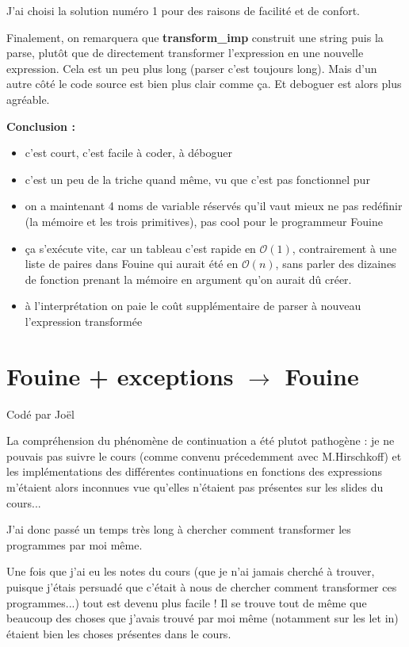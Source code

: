 \documentclass[a4paper,10pt]{report}
\begin{document}
J'ai choisi la solution numéro 1 pour des raisons de facilité et de confort. 
  
Finalement, on remarquera que \textbf{transform\_{}imp} construit une string puis la parse, plutôt que de directement transformer l'expression en une nouvelle expression. Cela est un peu plus long (parser c'est toujours long). Mais d'un autre côté le code source est bien plus clair comme ça. Et deboguer est alors plus agréable.

\textbf{Conclusion :}  
  
\begin{itemize}
\item c'est court, c'est facile à coder, à déboguer
\item c'est un peu de la triche quand même, vu que c'est pas fonctionnel pur
\item on a maintenant 4 noms de variable réservés qu'il vaut mieux ne pas redéfinir (la mémoire et les trois primitives), pas cool pour le programmeur Fouine
\item ça s'exécute vite, car un tableau c'est rapide en $\mathcal{O}(1)$, contrairement à une liste de paires dans Fouine qui aurait été en $\mathcal{O}(n)$, sans parler des dizaines de fonction prenant la mémoire en argument qu'on aurait dû créer.
\item à l'interprétation on paie le coût supplémentaire de parser à nouveau l'expression transformée
\end{itemize}

\section{Fouine + exceptions $\rightarrow$ Fouine}
Codé par Joël

La compréhension du phénomène de continuation a été plutot pathogène : je ne pouvais pas suivre le cours (comme convenu précedemment avec M.Hirschkoff) et les implémentations des différentes continuations en fonctions des expressions m'étaient alors inconnues vue qu'elles n'étaient pas présentes sur les slides du cours...

J'ai donc passé un temps très long à chercher comment transformer les programmes par moi même.

Une fois que j'ai eu les notes du cours (que je n'ai jamais cherché à trouver, puisque j'étais persuadé que c'était à nous de chercher comment transformer ces programmes...) tout est devenu plus facile ! Il se trouve tout de même que beaucoup des choses que j'avais trouvé par moi même (notamment sur les let in) étaient bien les choses présentes dans le cours.
\end{document}
